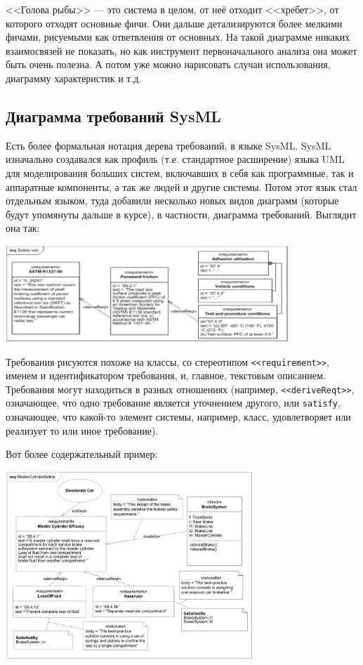 \documentclass{../../text-style}
\begin{document}
<<Голова рыбы>> --- это система в целом, от неё отходит <<хребет>>, от которого отходят основные фичи. Они дальше детализируются более мелкими фичами, рисуемыми как ответвления от основных. На такой диаграмме никаких взаимосвязей не показать, но как инструмент первоначального анализа она может быть очень полезна. А потом уже можно нарисовать случаи использования, диаграмму характеристик и т.д.

\subsection{Диаграмма требований SysML}

Есть более формальная нотация дерева требований, в языке SysML. SysML изначально создавался как профиль (т.е. стандартное расширение) языка UML для моделирования больших систем, включавших в себя как программные, так и аппаратные компоненты, а так же людей и другие системы. Потом этот язык стал отдельным языком, туда добавили несколько новых видов диаграмм (которые будут упомянуты дальше в курсе), в частности, диаграмма требований. Выглядит она так:

\begin{center}
    \includegraphics[width=0.8\textwidth]{sysMlRequirementDiagram.png}
\end{center}

Требования рисуются похоже на классы, со стереотипом \verb|<<requirement>>|, именем и идентификатором требования, и, главное, текстовым описанием. Требования могут находиться в разных отношениях (например, \verb|<<deriveReqt>>|, означающее, что одно требование является уточнением другого, или \verb|satisfy|, означающее, что какой-то элемент системы, например, класс, удовлетворяет или реализует то или иное требование).

Вот более содержательный пример:

\begin{center}
    \includegraphics[width=0.7\textwidth]{sysMlRequirementsExample.png}
\end{center}
\end{document}
